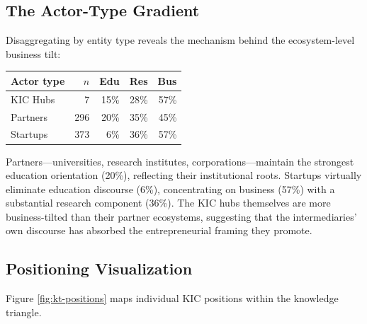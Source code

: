 \documentclass[../main.tex]{subfiles}
\begin{document}
\subsection{The Actor-Type Gradient}

Disaggregating by entity type reveals the mechanism behind the ecosystem-level business tilt:

\begin{center}
\small
\begin{tabular}{lrrrr}
\toprule
\textbf{Actor type} & \textbf{$n$} & \textbf{Edu} & \textbf{Res} & \textbf{Bus} \\
\midrule
KIC Hubs & 7 & 15\% & 28\% & 57\% \\
Partners & 296 & 20\% & 35\% & 45\% \\
Startups & 373 & 6\% & 36\% & 57\% \\
\bottomrule
\end{tabular}
\end{center}

Partners---universities, research institutes, corporations---maintain the strongest education orientation (20\%), reflecting their institutional roots. Startups virtually eliminate education discourse (6\%), concentrating on business (57\%) with a substantial research component (36\%). The KIC hubs themselves are more business-tilted than their partner ecosystems, suggesting that the intermediaries' own discourse has absorbed the entrepreneurial framing they promote.

\subsection{Positioning Visualization}

Figure \ref{fig:kt-positions} maps individual KIC positions within the knowledge triangle.
\end{document}
